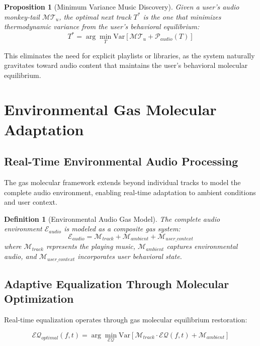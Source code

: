 \documentclass[12pt,a4paper]{article}
\newtheorem{proposition}[theorem]{Proposition}
\newtheorem{definition}[theorem]{Definition}
\begin{document}
\begin{proposition}[Minimum Variance Music Discovery]
Given a user's audio monkey-tail $\mathcal{MT}_u$, the optimal next track $T^*$ is the one that minimizes thermodynamic variance from the user's behavioral equilibrium:
\begin{equation}
T^* = \arg\min_T \text{Var}[\mathcal{MT}_u + \mathcal{P}_{audio}(T)]
\end{equation}
\end{proposition}

This eliminates the need for explicit playlists or libraries, as the system naturally gravitates toward audio content that maintains the user's behavioral molecular equilibrium.

\section{Environmental Gas Molecular Adaptation}

\subsection{Real-Time Environmental Audio Processing}

The gas molecular framework extends beyond individual tracks to model the complete audio environment, enabling real-time adaptation to ambient conditions and user context.

\begin{definition}[Environmental Audio Gas Model]
The complete audio environment $\mathcal{E}_{audio}$ is modeled as a composite gas system:
\begin{equation}
\mathcal{E}_{audio} = \mathcal{M}_{track} + \mathcal{M}_{ambient} + \mathcal{M}_{user\_context}
\end{equation}
where $\mathcal{M}_{track}$ represents the playing music, $\mathcal{M}_{ambient}$ captures environmental audio, and $\mathcal{M}_{user\_context}$ incorporates user behavioral state.
\end{definition}

\subsection{Adaptive Equalization Through Molecular Optimization}

Real-time equalization operates through gas molecular equilibrium restoration:

\begin{equation}
\mathcal{EQ}_{optimal}(f, t) = \arg\min_{\mathcal{EQ}} \text{Var}[\mathcal{M}_{track} \cdot \mathcal{EQ}(f, t) + \mathcal{M}_{ambient}]
\end{equation}
\end{document}
